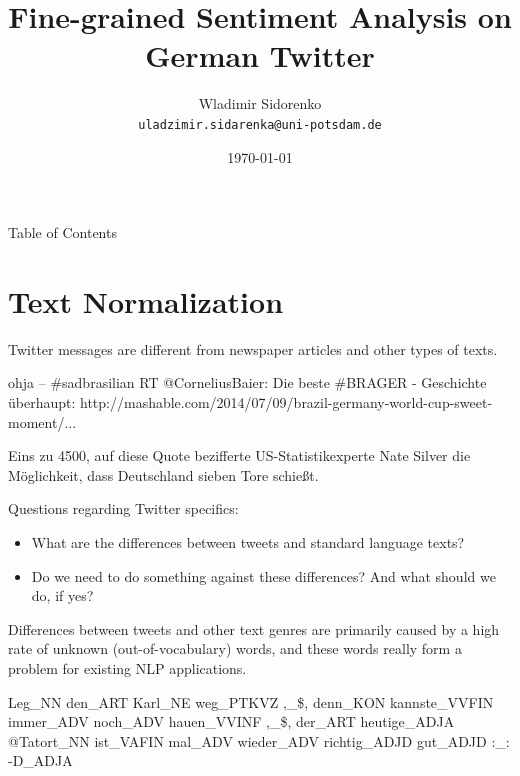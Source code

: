 \documentclass{beamer}
\title[Sentiment Analysis]{Fine-grained Sentiment Analysis on German Twitter}
\author[Sidorenko]{Wladimir Sidorenko\\ \texttt{uladzimir.sidarenka{@}uni-potsdam.de}}
\institute[Uni Potsdam]{University of Potsdam}
\date{\today}
\begin{document}
\begin{frame}{}
  \titlepage
\end{frame}

\begin{frame}{Table of Contents}
  \tableofcontents
\end{frame}

\section{Text Normalization}

\begin{frame}{}
  Twitter messages are different from newspaper articles and other
  types of texts.
  \begin{example}
    ohja -- \#sadbrasilian RT @CorneliusBaier: Die beste \#BRAGER -
    Geschichte \"uberhaupt:
    http://mashable.com/2014/07/09/brazil-germany-world-cup-sweet-moment/...
  \end{example}

  \begin{example}
    Eins zu 4500, auf diese Quote bezifferte US-Statistikexperte Nate
    Silver die M\"oglichkeit, dass Deutschland sieben Tore
    schie\ss{}t.  \end{example}
\end{frame}

\begin{frame}{}
  Questions regarding Twitter specifics:
  \begin{itemize}
    \item What are the differences between tweets and standard language texts?
    \item Do we need to do something against these differences?  And
      what should we do, if yes?
  \end{itemize}
\end{frame}

\begin{frame}{}
  Differences between tweets and other text genres are primarily
  caused by a high rate of unknown (out-of-vocabulary) words, and
  these words really form a problem for existing NLP applications.
  \begin{example}
    \alert{Leg\_NN} den\_ART Karl\_NE weg\_PTKVZ ,\_\$,
    \alert{denn\_KON} kannste\_VVFIN immer\_ADV noch\_ADV hauen\_VVINF
    ,\_\$, der\_ART heutige\_ADJA \alert{@Tatort\_NN} ist\_VAFIN
    mal\_ADV wieder\_ADV richtig\_ADJD gut\_ADJD :\_: \alert{-D\_ADJA}
  \end{example}
\end{frame}
\end{document}
